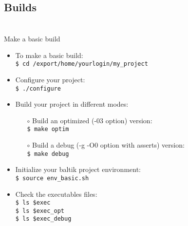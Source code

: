 \documentclass[10pt, hyperref={unicode=true,pdfusetitle, bookmarks=true,bookmarksnumbered=false,bookmarksopen=false, breaklinks=false,pdfborder={0 0 1},backref=true,colorlinks=true,linkcolor=darkblue,pageanchor, urlcolor=darkblue}]{beamer}
\begin{document}
\subsection{{\bf{Builds}}}
\begin{frame}
\begin{columns}[c] 
\tableofcontents[sections={1-3},currentsection, currentsubsection]
\tableofcontents[sections={4-8},currentsection, currentsubsection]
\end{columns}
\end{frame}
\begin{frame}
\frametitle{}
\begin{block}{Make a basic build}

\begin{itemize}
\item To make a basic build:\\
\texttt{\$ cd /export/home/yourlogin/my\_project}

\item Configure your project:\\
\texttt{\$ ./configure}

\item Build your project in different modes:\\
    \begin{itemize}
    \item [$\circ$] Build an optimized (-03 option) version:\\
    \texttt{\$ make optim}
    \item [$\circ$] Build a debug (-g -O0 option with asserts) version:\\
    \texttt{\$ make debug}
    \end{itemize}

\item Initialize your baltik project environment:\\
\texttt{\$ source env\_basic.sh}\\

\item Check the executables files:\\
\texttt{\$ ls \$exec}\\
\texttt{\$ ls \$exec\_opt}\\
\texttt{\$ ls \$exec\_debug}\\

\end{itemize}

\end{block}
\end{frame}
\end{document}
